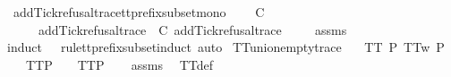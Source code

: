 \begin{isabellebody}
\endisatagproof
{\isafoldproof}%
%
\isadelimproof
\isanewline
%
\endisadelimproof
\isanewline
{}\isamarkupfalse%
\ add{\isacharunderscore}Tick{\isacharunderscore}refusal{\isacharunderscore}trace{\isacharunderscore}tt{\isacharunderscore}prefix{\isacharunderscore}subset{\isacharunderscore}mono{\isacharcolon}\isanewline
\ \ \ {\isachardoublequoteopen}{\isasymrho}\ {\isasymlesssim}\isactrlsub C\ {\isasymsigma}{\isachardoublequoteclose}\isanewline
\ \ \ \ \ {\isachardoublequoteopen}add{\isacharunderscore}Tick{\isacharunderscore}refusal{\isacharunderscore}trace\ {\isasymrho}\ {\isasymlesssim}\isactrlsub C\ add{\isacharunderscore}Tick{\isacharunderscore}refusal{\isacharunderscore}trace\ {\isasymsigma}{\isachardoublequoteclose}\isanewline
%
\isadelimproof
\ \ %
\endisadelimproof
%
\isatagproof
{}\isamarkupfalse%
\ assms\ \isamarkupfalse%
{\isacharparenleft}induct\ {\isasymrho}\ {\isasymsigma}\ rule{\isacharcolon}tt{\isacharunderscore}prefix{\isacharunderscore}subset{\isachardot}induct{\isacharcomma}\ auto{\isacharparenright}%
\endisatagproof
{\isafoldproof}%
%
\isadelimproof
%
\endisadelimproof
%
\isamarkupfalse%
\ TT{}{\isacharunderscore}union{\isacharunderscore}empty{\isacharunderscore}trace{\isacharcolon}\isanewline
\ \ \ {\isachardoublequoteopen}TT{}\ P{\isachardoublequoteclose}\ {\isachardoublequoteopen}TT{}w\ P{\isachardoublequoteclose}\isanewline
\ \ \ {\isachardoublequoteopen}TT{}{\isacharparenleft}P\ {\isasymunion}\ {\isacharbraceleft}{\isacharbrackleft}{\isacharbrackright}{\isacharbraceright}{\isacharparenright}\ {\isacharequal}\ TT{}{\isacharparenleft}P{\isacharparenright}{\isachardoublequoteclose}\isanewline
%
\isadelimproof
\ \ %
\endisadelimproof
%
\isatagproof
{}\isamarkupfalse%
\ assms\ \isamarkupfalse%
\ TT{}{\isacharunderscore}def\isanewline

\end{isabellebody}
